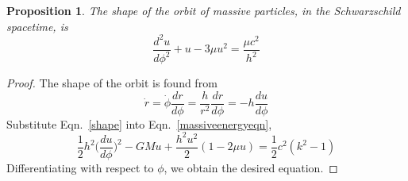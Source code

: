 \documentclass[a4paper]{article}
\theoremstyle{new}
\newtheorem{prop}{Proposition}[section]
\begin{document}
\begin{prop}
The shape of the orbit of massive particles, in the Schwarzschild spacetime, is
\begin{equation}
\frac{d^2u}{d\phi^2}+u-3\mu u^2=\frac{\mu c^2}{h^2}\label{shapemassive}
\end{equation}
\end{prop}
\begin{proof}
The shape of the orbit is found from
\begin{equation}
\dot{r}=\dot{\phi}\frac{dr}{d\phi}=\frac{h}{r^2}\frac{dr}{d\phi}=-h\frac{du}{d\phi}\label{shape}
\end{equation}
Substitute Eqn.~\ref{shape} into Eqn.~\ref{massiveenergyeqn},
$$\frac{1}{2}h^2\bigg(\frac{du}{d\phi}\bigg)^2-GMu+\frac{h^2u^2}{2}(1-2\mu u)=\frac{1}{2}c^2(k^2-1)$$
Differentiating with respect to $\phi$, we obtain the desired equation.
\end{proof}
\end{document}
